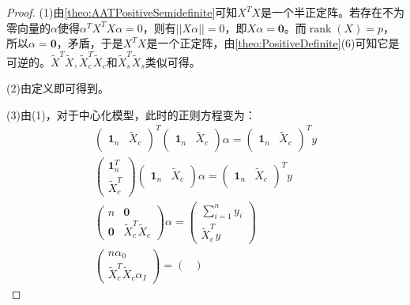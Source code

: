 \begin{proof}
	(1)由\cref{theo:AATPositiveSemidefinite}可知$X^TX$是一个半正定阵。若存在不为零向量的$\alpha$使得$\alpha^TX^TX\alpha=0$，则有$||X\alpha||=0$，即$X\alpha=\mathbf{0}$。而$\operatorname{rank}(X)=p$，所以$\alpha=\mathbf{0}$，矛盾，于是$X^TX$是一个正定阵，由\cref{theo:PositiveDefinite}(6)可知它是可逆的。$\tilde{X}^T\tilde{X},\tilde{X}_c^T\tilde{X}_c$和$\tilde{X}_s^T\tilde{X}_s$类似可得。\par
	(2)由定义即可得到。\par
	(3)由(1)，对于中心化模型，此时的正则方程变为：
	\begin{gather*}
		\begin{pmatrix}
			\mathbf{1}_n & \tilde{X}_c \\
		\end{pmatrix}^T
		\begin{pmatrix}
			\mathbf{1}_n & \tilde{X}_c \\
		\end{pmatrix}\alpha=
		\begin{pmatrix}
			\mathbf{1}_n & \tilde{X}_c \\
		\end{pmatrix}^Ty \\
		\begin{pmatrix}
			\mathbf{1}_n^T \\
			\tilde{X}_c^T
		\end{pmatrix}
		\begin{pmatrix}
			\mathbf{1}_n & \tilde{X}_c \\
		\end{pmatrix}\alpha=
		\begin{pmatrix}
			\mathbf{1}_n & \tilde{X}_c \\
		\end{pmatrix}^Ty \\
		\begin{pmatrix}
			n & \mathbf{0} \\
			\mathbf{0} & \tilde{X}_c^T\tilde{X}_c
		\end{pmatrix}\alpha=
		\begin{pmatrix}
			\sum\limits_{i=1}^{n}y_i \\
			\tilde{X}_c^Ty
		\end{pmatrix} \\
		\begin{pmatrix}
			n\alpha_0  \\
			\tilde{X}_c^T\tilde{X}_c\alpha_I
		\end{pmatrix}=
		\begin{pmatrix}

\end{pmatrix}
\end{gather*}
\end{proof}
